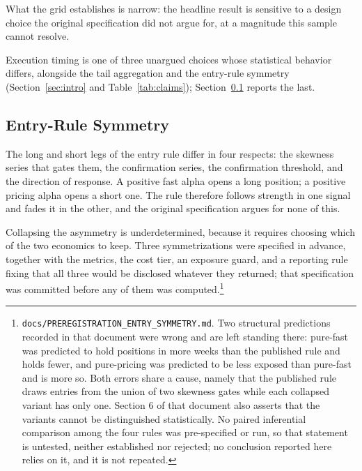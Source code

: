 \documentclass[11pt]{article}
\begin{document}
What the grid establishes is narrow: the headline result is sensitive to a design choice the original specification did not argue for, at a magnitude this sample cannot resolve.

Execution timing is one of three unargued choices whose statistical behavior differs, alongside the tail aggregation and the entry-rule symmetry (Section~\ref{sec:intro} and Table~\ref{tab:claims}); Section~\ref{sec:entrysymmetry} reports the last.

\subsection{Entry-Rule Symmetry}
\label{sec:entrysymmetry}

The long and short legs of the entry rule differ in four respects: the skewness series that gates them, the confirmation series, the confirmation threshold, and the direction of response. A positive fast alpha opens a long position; a positive pricing alpha opens a short one. The rule therefore follows strength in one signal and fades it in the other, and the original specification argues for none of this.

Collapsing the asymmetry is underdetermined, because it requires choosing which of the two economics to keep. Three symmetrizations were specified in advance, together with the metrics, the cost tier, an exposure guard, and a reporting rule fixing that all three would be disclosed whatever they returned; that specification was committed before any of them was computed.\footnote{\texttt{docs/PREREGISTRATION\_ENTRY\_SYMMETRY.md}. Two structural predictions recorded in that document were wrong and are left standing there: pure-fast was predicted to hold positions in more weeks than the published rule and holds fewer, and pure-pricing was predicted to be less exposed than pure-fast and is more so. Both errors share a cause, namely that the published rule draws entries from the union of two skewness gates while each collapsed variant has only one. Section 6 of that document also asserts that the variants cannot be distinguished statistically. No paired inferential comparison among the four rules was pre-specified or run, so that statement is untested, neither established nor rejected; no conclusion reported here relies on it, and it is not repeated.}
\end{document}
